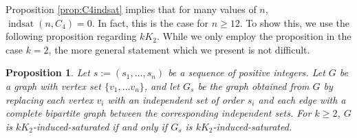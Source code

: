 \documentclass[12pt]{amsart}
\theoremstyle{plain}
\newtheorem{prop}[thm]{Proposition}
\theoremstyle{definition}
\theoremstyle{remark}
\newcommand{\indsat}[2]{\ensuremath{\operatorname{indsat}(#1,#2)}\xspace}
\begin{document}

Proposition \ref{prop:C4indsat} implies that for many values of $n$, $\indsat{n}{C_4}=0$. In fact, this is the case for $n \geq 12$. To show this, we use the following proposition regarding $kK_2$.  While we only employ the proposition in the case $k = 2$, the more general statement which we present is not difficult.


\begin{prop}\label{twins matching}
Let $s:=(s_1,\dots, s_n)$ be a sequence of positive integers.  Let $G$ be a graph with vertex set $\{v_1,\ldots v_n\}$, and let $G_s$ be the graph obtained from $G$ by replacing each vertex $v_i$ with an independent set of order $s_i$ and each edge with a complete bipartite graph between the corresponding independent sets.
For $k \ge 2$, $G$ is $kK_2$-induced-saturated if and only if $G_s$ is  $kK_2$-induced-saturated.
\end{prop}
\end{document}

